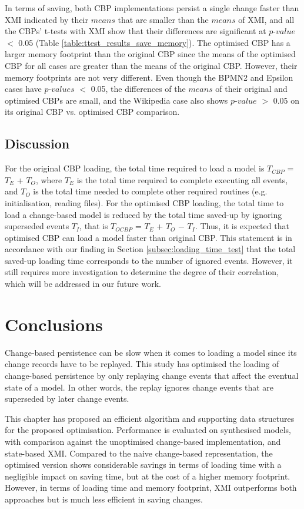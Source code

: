 {In terms of saving, both CBP implementations persist a single change faster than XMI indicated by their $means$ that are smaller than the $means$ of XMI, and all the CBPs' t-tests with XMI show that their differences are significant at $p$-$value$ $<$ 0.05 (Table \ref{table:ttest_results_save_memory}). The optimised CBP has a larger memory footprint than the original CBP since the means of the optimised CBP for all cases are greater than the means of the original CBP. However, their memory footprints are not very different. Even though the BPMN2 and Epsilon cases have $p$-$values$ $<$ 0.05, the differences of the $means$ of their original and optimised CBPs are small, and the Wikipedia case also shows $p$-$value$ $>$ 0.05 on its original CBP vs. optimised CBP comparison.   

\subsection{Discussion}
\label{sec:discussion}
For the original CBP loading, the total time required to load a model is $T_{CBP}$ = $T_E$ + $T_O$, where $T_E$ is the total time required to complete executing all events, and $T_O$ is the total time needed to complete other required routines (e.g. initialisation, reading files). For the optimised CBP loading, the total time to load a change-based model is reduced by the total time saved-up by ignoring superseded events $T_I$, that is $T_{OCBP}$ = $T_E$ + $T_O$ $-$ $T_I$. Thus, it is expected that optimised CBP can load a model faster than original CBP. This statement is in accordance with our finding in Section \ref{subsec:loading_time_test} that the total saved-up loading time corresponds to the number of ignored events. However, it still requires more investigation to determine the degree of their correlation, which will be addressed in our future work.

\section{Conclusions}
\label{sec:conclusions_4}
Change-based persistence can be slow when it comes to loading a model since its change records have to be replayed. This study has optimised the loading of change-based persistence by only replaying change events that affect the eventual state of a model. In other words, the replay ignores change events that are superseded by later change events.
 
This chapter has proposed an efficient algorithm and supporting data structures for the proposed optimisation. Performance is evaluated on synthesised models, with comparison against the unoptimised change-based implementation, and state-based XMI. Compared to the naive change-based representation, the optimised version shows considerable savings in terms of loading time with a negligible impact on saving time, but at the cost of a higher memory footprint. However, in terms of loading time and memory footprint, XMI outperforms both approaches but is much less efficient in saving changes. 

}
